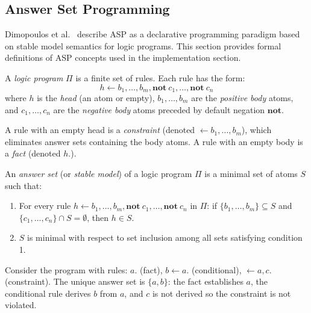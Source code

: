 \subsection{Answer Set Programming}
\label{sec:foundations_asp}

Dimopoulos et al.~\cite{Dimopoulos1997} describe \ac{ASP} as a declarative programming paradigm based on stable model semantics for logic programs. This section provides formal definitions of \ac{ASP} concepts used in the implementation section.

\begin{defn}
    \label{defn:logic_program}
    A \emph{logic program} $\Pi$ is a finite set of rules. Each rule has the form:
    \begin{equation*}
        h \leftarrow b_1, \ldots, b_m, \mathbf{not}\ c_1, \ldots, \mathbf{not}\ c_n
    \end{equation*}
    where $h$ is the \emph{head} (an atom or empty), $b_1, \ldots, b_m$ are the \emph{positive body} atoms, and $c_1, \ldots, c_n$ are the \emph{negative body} atoms preceded by default negation $\mathbf{not}$.
\end{defn}

A rule with an empty head is a \emph{constraint} (denoted $\leftarrow b_1, \ldots, b_m$), which eliminates answer sets containing the body atoms. A rule with an empty body is a \emph{fact} (denoted $h.$).

\begin{defn}
    \label{defn:answer_set}
    An \emph{answer set} (or \emph{stable model}) of a logic program $\Pi$ is a minimal set of atoms $S$ such that:
    \begin{enumerate}
        \item For every rule $h \leftarrow b_1, \ldots, b_m, \mathbf{not}\ c_1, \ldots, \mathbf{not}\ c_n$ in $\Pi$: if $\{b_1, \ldots, b_m\} \subseteq S$ and $\{c_1, \ldots, c_n\} \cap S = \emptyset$, then $h \in S$.
        \item $S$ is minimal with respect to set inclusion among all sets satisfying condition 1.
    \end{enumerate}
\end{defn}

\begin{example}
    Consider the program with rules: $a.$ (fact), $b \leftarrow a.$ (conditional), $\leftarrow a, c.$ (constraint). The unique answer set is $\{a, b\}$: the fact establishes $a$, the conditional rule derives $b$ from $a$, and $c$ is not derived so the constraint is not violated.
\end{example}

